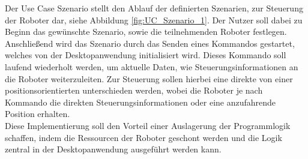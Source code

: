Der Use Case Szenario stellt den Ablauf der definierten Szenarien, zur Steuerung der Roboter dar, siehe Abbildung \eqref{fig:UC_Szenario_1}. Der Nutzer soll dabei zu Beginn das gewünschte Szenario, sowie die teilnehmenden Roboter festlegen. Anschließend wird das Szenario durch das Senden eines Kommandos gestartet, welches von der Desktopanwendung initialisiert wird. Dieses Kommando soll laufend wiederholt werden, um aktuelle Daten, wie Steuerungsinformationen an die Roboter weiterzuleiten. Zur Steuerung sollen hierbei eine direkte von einer positionsorientierten unterschieden werden, wobei die Roboter je nach Kommando die direkten Steuerungsinformationen oder eine anzufahrende Position erhalten.\\
Diese Implementierung soll den Vorteil einer Auslagerung der Programmlogik schaffen, indem die Ressourcen der Roboter geschont werden und die Logik zentral in der Desktopanwendung ausgeführt werden kann.\\
 
